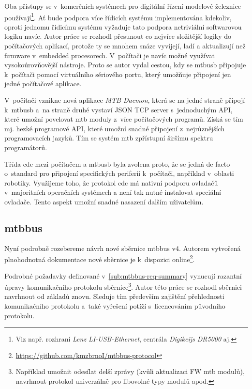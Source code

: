 Oba přístupy se v~komerčních systémech pro digitální řízení modelové železnice
používají\footnote{Viz např. rozhraní \textit{Lenz LI-USB-Ethernet}, centrála
\textit{Digikeijs DR5000} aj.}.
Ať bude podpora více řídicích systému implementována kdekoliv, oproti jednomu
řídicímu systému vyžaduje tato podpora netriviální softwarovou logiku navíc.
Autor práce se rozhodl přesunout co nejvíce složitější logiky do počítačových
aplikací, protože ty se mnohem snáze vyvíjejí, ladí a aktualizují než
firmware v~embedded procesorech. V~počítači je navíc možné využívat
vysokoúrovňovější nástroje. Proto se autor vydal cestou, kdy se
\gls{mtbusb} připojuje k~počítači pomocí virtuálního sériového portu, který
umožňuje připojení jen jedné počítačové aplikace.

V~počítači vznikne nová aplikace \textit{MTB Daemon}, která se na jedné
straně připojí k~\gls{mtbusb} a~na straně druhé vystaví JSON TCP
server s~jednoduchým API, které umožní povelovat \gls{mtb} moduly z~více
počítačových programů. Získá se tím mj. hezké programové API, které
umožní snadné připojení z~nejrůznějších programovacích jazyků.
Tím se systém \gls{mtb} zpřístupní širšímu spektru programátorů.

Třída \gls{cdc} mezi počítačem a \gls{mtbusb} byla zvolena proto, že se jedná
de facto o~standard pro připojení specifických periferií k~počítači, například
v~oblasti robotiky. Využijeme toho, že protokol \gls{cdc} má nativní
podporu ovladačů v~majoritních operačních systémech a není tak nutné instalovat
speciální ovladače. Tento aspekt umožní snadné nasazení dalším uživatelům.

\subsection{\gls{mtbbus}}

Nyní podrobně rozebereme návrh nové sběrnice \gls{mtbbus} v4. Autorem vytvořená
plnohodnotná dokumentace nové sběrnice je k~dispozici
online\footnote{\url{https://github.com/kmzbrnoI/mtbbus-protocol}}.

Podrobné požadavky definované v~\ref{sub:mtbbus-req-summary} vynucují razantní
úpravy komunikačního protokolu sběrnice\footnote{Například umožnit odesílat
delší zprávy (kvůli aktualizaci FW \gls{mtb} modulů), navrhnout protokol
univerzálně pro libovolné typy modulů apod.}. Autor této práce se rozhodl
sběrnici navrhnout od základů znovu. Sleduje tím především zajištění
přehlednosti komunikačního protokolu a~také vyřešení potíží s~licencováním
původního protokolu.

